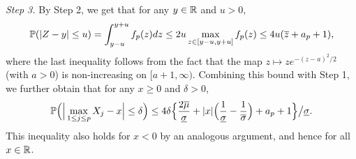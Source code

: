 \textit{Step 3.} By Step 2, we get that for any $y \in \mathbb{R}$ and $u > 0$, 
\[ \mathbb{P}( |Z - y| \le u) = \int_{y - u}^{y + u} f_p(z) dz \le 2u \max_{z \in [y-u,y+u]} f_p(z) \le 4u (\overline{z} + a_p + 1), \] 
where the last inequality follows from the fact that the map $z \mapsto z e^{-(z-a)^2/2}$ (with $a > 0$) is non-increasing on $[a+1,\infty)$. Combining this bound with Step 1, we further obtain that for any $x \ge 0$ and $\delta > 0$, 
\begin{equation}\label{eq-bound1-Levy}
\mathbb{P} \Big( \Big| \max_{1 \le j \le p} X_j - x \Big| \le \delta \Big) \le 4\delta \Big\{ \frac{2\overline{\mu}}{\underline{\sigma}} + |x| \Big(\frac{1}{\underline{\sigma}} - \frac{1}{\overline{\sigma}}\Big) + a_p + 1 \Big\} \big/ \underline{\sigma}. 
\end{equation} 
This inequality also holds for $x < 0$ by an analogous argument, and hence for all $x \in \mathbb{R}$. 


